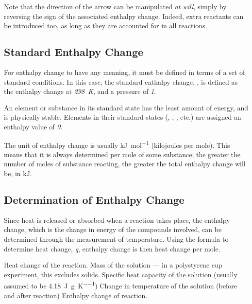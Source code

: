 			Note that the direction of the arrow can be manipulated \textit{at will}, simply by reversing the sign of the associated enthalpy
			change. Indeed, extra reactants can be introduced too, as long as they are accounted for in all reactions.


		\subsection{Standard Enthalpy Change}

			For enthalpy change to have any meaning, it must be defined in terms of a set of standard conditions. In this case, the standard
			enthalpy change, \enthStd{}, is defined as the enthalpy change at \textit{\SI{298}{\kelvin}}, and a pressure of \textit{\SI{1}{\atm}}.

			An element or substance in its standard state has the least amount of energy, and is physically stable. Elements in their standard
			states (, , , etc.) are assigned an enthalpy value of \textit{0}.

			The unit of enthalpy change is usually \si{\kilo\joule\per\mole} (kilojoules per mole). This means that it is always determined
			per mole of some substance; the greater the number of moles of substance reacting, the greater the total enthalpy change will be,
			in \si{\kilo\joule}.


		\pagebreak
		\subsection{Determination of Enthalpy Change}

			Since heat is released or absorbed when a reaction takes place, the enthalpy change, which is the change in energy of the compounds
			involved, can be determined through the measurement of temperature. Using the formula to determine heat change, \textit{q}, enthalpy change
			is then heat change per mole.


			\vbox{
				\tabto{0mm}\tabto{15mm}	Heat change of the reaction.
				\tabto{0mm}\tabto{15mm}	Mass of the solution — in a polystyrene cup experiment, this excludes solids.
				\tabto{0mm}\tabto{15mm}	Specific heat capacity of the solution (usually assumed to be \SI{4.18}{\joule\per\gram\per\kelvin})
				\tabto{0mm}\tabto{15mm}Change in temperature of the solution (before and after reaction)
				\tabto{0mm}\tabto{15mm}Enthalpy change of reaction.
			}


